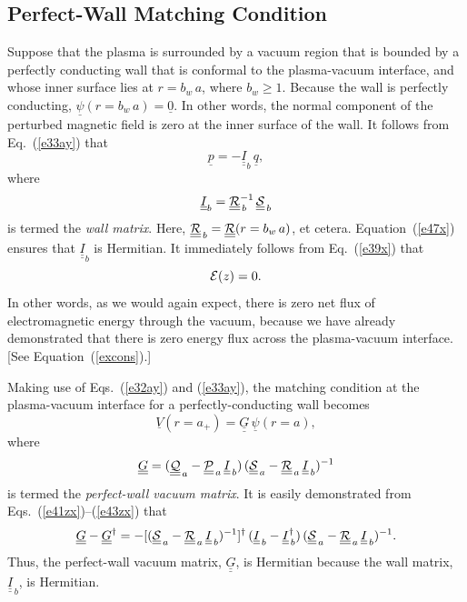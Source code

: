 \documentclass[12pt,prb,aps]{revtex4-1}
\begin{document}
\subsection{Perfect-Wall Matching Condition}
Suppose that the plasma is surrounded by a vacuum region that is bounded by a perfectly conducting wall that is conformal to the plasma-vacuum interface, and whose inner surface lies at $r=b_w\,a$, where $b_w\geq 1$. 
Because the wall is perfectly conducting, 
$\underline{\psi}(r=b_w\,a)=\underline{0}$.\cite{gs1}
In other words, the normal component of the perturbed magnetic field is zero at the inner surface of the wall. 
It follows from Eq.~(\ref{e33ay}) that
\begin{equation}
\underline{p} =- \underline{\underline{I}}_b\,\underline{q},
\end{equation}
where
\begin{equation}
 \underline{\underline{I}}_b= \underline{\underline{\cal R}}_{\,b}^{-1}\,\underline{\underline{\cal S}}_{\,b}
 \end{equation}
 is termed the {\em wall matrix}.
 Here, $\underline{\underline{\cal R}}_{\,b}= \underline{\underline{\cal R}}(r=b_w\,a)$, et cetera. Equation~(\ref{e47x}) ensures that $ \underline{\underline{I}}_b$
 is Hermitian. It immediately follows from Eq.~(\ref{e39x}) that
 \begin{equation}\label{ezero1}
 {\cal E}(z)=0.
 \end{equation}
  In other words, as we would again expect, there is zero net flux of electromagnetic energy through the vacuum, because we have already demonstrated that there is zero
  energy flux across the plasma-vacuum interface. [See Equation~(\ref{excons}).]  
 
  Making use of Eqs.~(\ref{e32ay}) and (\ref{e33ay}),  the matching condition at the plasma-vacuum interface  for a perfectly-conducting wall becomes 
 \begin{equation}\label{gdef}
 \underline{V}(r=a_+)= \underline{\underline{G}}\,\underline{\psi}(r=a),
 \end{equation}
 where 
 \begin{equation}
 \underline{\underline{G}}= (\underline{\underline{\cal Q}}_{\,a}-\underline{\underline{\cal P}}_{\,a}\,\underline{\underline{I}}_{\,b})\,(\underline{\underline{\cal S}}_{\,a}-\underline{\underline{\cal R}}_{\,a}\,\underline{\underline{I}}_{\,b})^{-1}
 \end{equation}
 is termed the {\em perfect-wall vacuum matrix}.
It is easily demonstrated from  Eqs.~(\ref{e41zx})--(\ref{e43zx})  that
 \begin{equation}\label{e53xx}
 \underline{\underline{G}}-\underline{\underline{G}}^\dag =- [(\underline{\underline{\cal S}}_{\,a}-\underline{\underline{\cal R}}_{\,a}\,\underline{\underline{I}}_{\,b})^{-1}]^{\dag}\,(\underline{\underline{I}}_{\,b} -\underline{\underline{I}}^\dag_{\,b})\,  (\underline{\underline{\cal S}}_{\,a}-\underline{\underline{\cal R}}_{\,a}\,\underline{\underline{I}}_{\,b})^{-1}.
\end{equation}
Thus,  the perfect-wall vacuum matrix, $\underline{\underline{G}}$, is Hermitian because  the wall matrix, $\underline{\underline{I}}_{\,b}$, is Hermitian. 
 
\end{document}
